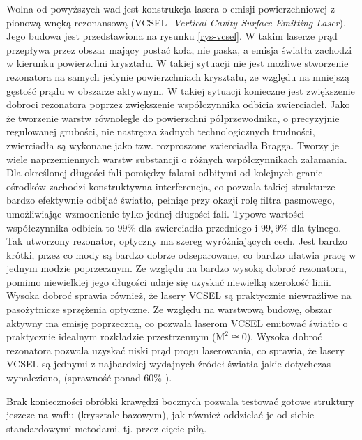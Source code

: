 \documentclass[a4paper,10pt,twoside]{article}
\begin{document}
Wolna od powyższych wad jest konstrukcja lasera o emisji powierzchniowej z pionową wnęką rezonansową (VCSEL -\textit{Vertical Cavity Surface Emitting Laser}). Jego budowa jest przedstawiona na rysunku \ref{rys-vcsel}. W takim laserze prąd przepływa przez obszar mający postać koła, nie paska, a emisja światła zachodzi w kierunku powierzchni kryształu. W takiej sytuacji nie jest możliwe stworzenie rezonatora na samych jedynie powierzchniach kryształu, ze względu na mniejszą gęstość prądu w obszarze aktywnym. W takiej sytuacji konieczne jest zwiększenie dobroci rezonatora poprzez zwiększenie współczynnika odbicia zwierciadeł. Jako że tworzenie warstw równolegle do powierzchni półprzewodnika, o precyzyjnie regulowanej grubości, nie nastręcza żadnych technologicznych trudności, zwierciadła są wykonane jako tzw. rozproszone zwierciadła Bragga. Tworzy je wiele naprzemiennych warstw substancji o różnych współczynnikach załamania. Dla określonej długości fali pomiędzy falami odbitymi od kolejnych granic ośrodków zachodzi konstruktywna interferencja, co pozwala takiej strukturze bardzo efektywnie odbijać światło, pełniąc przy okazji rolę filtra pasmowego, umożliwiając wzmocnienie tylko jednej długości fali. Typowe wartości współczynnika odbicia to $99\%$ dla zwierciadła przedniego i $99{,}9\%$ dla tylnego. Tak utworzony rezonator, optyczny ma szereg wyróżniających cech. Jest bardzo krótki, przez co mody są bardzo dobrze odseparowane, co bardzo ułatwia pracę w jednym modzie poprzecznym. Ze względu na bardzo wysoką dobroć rezonatora, pomimo niewielkiej jego długości udaje się uzyskać niewielką szerokość linii. Wysoka dobroć sprawia również, że lasery VCSEL są praktycznie niewrażliwe na pasożytnicze sprzężenia optyczne.
Ze względu na warstwową budowę, obszar aktywny ma emisję poprzeczną, co pozwala laserom VCSEL emitować światło o praktycznie idealnym rozkładzie przestrzennym ($\mathrm{M^2} \cong 0$). Wysoka dobroć rezonatora pozwala uzyskać niski prąd progu laserowania, co sprawia, że lasery VCSEL są jednymi z najbardziej wydajnych źródeł światła jakie dotychczas wynaleziono, (sprawność ponad 60\% \cite{spie}). 

Brak konieczności obróbki krawędzi bocznych pozwala testować gotowe struktury jeszcze na waflu (krysztale bazowym), jak również oddzielać je od siebie standardowymi metodami, tj. przez cięcie piłą. 
\end{document}
